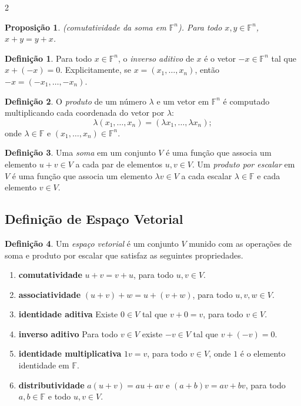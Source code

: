 \documentclass{article}
\theoremstyle{plain}
\newtheorem{prop}[thm]{Proposição}
\theoremstyle{definition}
\newtheorem{defn}{Definição}[section]
\theoremstyle{remark}
\begin{document}
\begin{multicols}{2}
\begin{prop} (comutatividade da soma em \(\mathbb{F}^n\)).
    Para todo \(x, y \in \mathbb{F}^n\), \(x + y = y + x\).
\end{prop}

\begin{defn}
    Para todo \(x \in \mathbb{F}^n\), o \emph{inverso aditivo} de \(x\) é o vetor \(-x \in \mathbb{F}^n\) tal que \(x + (-x) = 0\). Explicitamente, se \(x = (x_1, \ldots, x_n)\), então \(-x = (-x_1, \ldots, -x_n)\).
\end{defn}

\begin{defn}
    O \emph{produto} de um número \(\lambda\) e um vetor em \(\mathbb{F}^n\) é computado multiplicando cada coordenada do vetor por \(\lambda\):
    \[
        \lambda (x_1, \ldots, x_n) = (\lambda x_1, \ldots, \lambda x_n);
    \]
    \noindent onde \(\lambda \in \mathbb{F}\) e \((x_1, \ldots, x_n) \in \mathbb{F}^n\).
\end{defn}

\begin{defn}
    Uma \emph{soma} em um conjunto \(V\) é uma função que associa um elemento \(u + v \in V\) a cada par de elementos \(u, v \in V\). Um \emph{produto por escalar} em \(V\) é uma função que associa um elemento \(\lambda v \in V\) a cada escalar \(\lambda \in \mathbb{F}\) e cada elemento \(v \in V\). 
\end{defn}

\subsection{Definição de Espaço Vetorial}
\begin{defn}
    Um \emph{espaço vetorial} é um conjunto \(V\) munido com as operações de soma e produto por escalar que satisfaz as seguintes propriedades.
    \begin{enumerate}
        \item[(A1)] \textbf{comutatividade} \(u + v = v + u\), para todo \(u, v \in V\).
        \item[(A2)] \textbf{associatividade} \((u + v) + w = u + (v + w)\), para todo \(u, v, w \in V\).
        \item[(A3)] \textbf{identidade aditiva} Existe \(0 \in V\) tal que \(v + 0 = v\), para todo \(v \in V\).
        \item[(A4)] \textbf{inverso aditivo} Para todo \(v \in V\) existe \(-v \in V\) tal que \(v + (-v) = 0\).
        \item[(A5)] \textbf{identidade multiplicativa} \(1v = v\), para todo \(v \in V\), onde \(1\) é o elemento identidade em \(\mathbb{F}\).
        \item[(A6)] \textbf{distributividade} \(a(u + v) = au + av\) e \((a+b)v=av + bv\), para todo \(a, b \in \mathbb{F}\) e todo \(u, v \in V\).
    \end{enumerate}
\end{defn}


\end{multicols}
\end{document}
